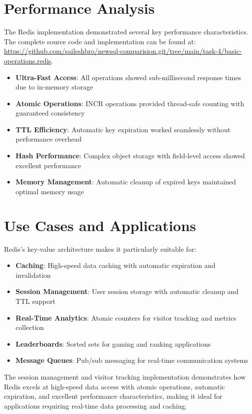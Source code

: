 \section{Performance Analysis}

The Redis implementation demonstrated several key performance characteristics. The complete source code and implementation can be found at: \url{https://github.com/saileshbro/newsql-comparision.git/tree/main/task-4/basic-operations.redis}.

\begin{itemize}
    \item \textbf{Ultra-Fast Access}: All operations showed sub-millisecond response times due to in-memory storage
    \item \textbf{Atomic Operations}: INCR operations provided thread-safe counting with guaranteed consistency
    \item \textbf{TTL Efficiency}: Automatic key expiration worked seamlessly without performance overhead
    \item \textbf{Hash Performance}: Complex object storage with field-level access showed excellent performance
    \item \textbf{Memory Management}: Automatic cleanup of expired keys maintained optimal memory usage
\end{itemize}

\section{Use Cases and Applications}

Redis's key-value architecture makes it particularly suitable for:

\begin{itemize}
    \item \textbf{Caching}: High-speed data caching with automatic expiration and invalidation
    \item \textbf{Session Management}: User session storage with automatic cleanup and TTL support
    \item \textbf{Real-Time Analytics}: Atomic counters for visitor tracking and metrics collection
    \item \textbf{Leaderboards}: Sorted sets for gaming and ranking applications
    \item \textbf{Message Queues}: Pub/sub messaging for real-time communication systems
\end{itemize}

The session management and visitor tracking implementation demonstrates how Redis excels at high-speed data access with atomic operations, automatic expiration, and excellent performance characteristics, making it ideal for applications requiring real-time data processing and caching.